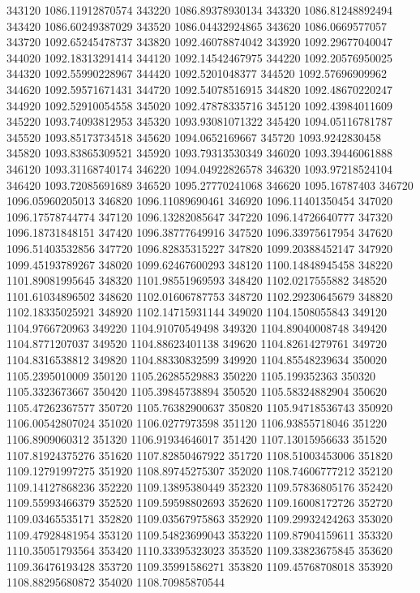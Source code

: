 {343120 1086.11912870574
343220 1086.89378930134
343320 1086.81248892494
343420 1086.60249387029
343520 1086.04432924865
343620 1086.0669577057
343720 1092.65245478737
343820 1092.46078874042
343920 1092.29677040047
344020 1092.18313291414
344120 1092.14542467975
344220 1092.20576950025
344320 1092.55990228967
344420 1092.5201048377
344520 1092.57696909962
344620 1092.59571671431
344720 1092.54078516915
344820 1092.48670220247
344920 1092.52910054558
345020 1092.47878335716
345120 1092.43984011609
345220 1093.74093812953
345320 1093.93081071322
345420 1094.05116781787
345520 1093.85173734518
345620 1094.0652169667
345720 1093.9242830458
345820 1093.83865309521
345920 1093.79313530349
346020 1093.39446061888
346120 1093.31168740174
346220 1094.04922826578
346320 1093.97218524104
346420 1093.72085691689
346520 1095.27770241068
346620 1095.16787403
346720 1096.05960205013
346820 1096.11089690461
346920 1096.11401350454
347020 1096.17578744774
347120 1096.13282085647
347220 1096.14726640777
347320 1096.18731848151
347420 1096.38777649916
347520 1096.33975617954
347620 1096.51403532856
347720 1096.82835315227
347820 1099.20388452147
347920 1099.45193789267
348020 1099.62467600293
348120 1100.14848945458
348220 1101.89081995645
348320 1101.98551969593
348420 1102.0217555882
348520 1101.61034896502
348620 1102.01606787753
348720 1102.29230645679
348820 1102.18335025921
348920 1102.14715931144
349020 1104.1508055843
349120 1104.9766720963
349220 1104.91070549498
349320 1104.89040008748
349420 1104.8771207037
349520 1104.88623401138
349620 1104.82614279761
349720 1104.8316538812
349820 1104.88330832599
349920 1104.85548239634
350020 1105.2395010009
350120 1105.26285529883
350220 1105.199352363
350320 1105.3323673667
350420 1105.39845738894
350520 1105.58324882904
350620 1105.47262367577
350720 1105.76382900637
350820 1105.94718536743
350920 1106.00542807024
351020 1106.0277973598
351120 1106.93855718046
351220 1106.8909060312
351320 1106.91934646017
351420 1107.13015956633
351520 1107.81924375276
351620 1107.82850467922
351720 1108.51003453006
351820 1109.12791997275
351920 1108.89745275307
352020 1108.74606777212
352120 1109.14127868236
352220 1109.13895380449
352320 1109.57836805176
352420 1109.55993466379
352520 1109.59598802693
352620 1109.16008172726
352720 1109.03465535171
352820 1109.03567975863
352920 1109.29932424263
353020 1109.47928481954
353120 1109.54823699043
353220 1109.87904159611
353320 1110.35051793564
353420 1110.33395323023
353520 1109.33823675845
353620 1109.36476193428
353720 1109.35991586271
353820 1109.45768708018
353920 1108.88295680872
354020 1108.70985870544
}
